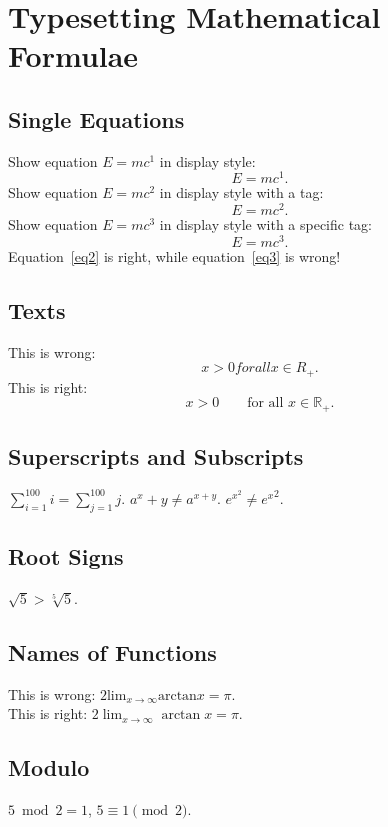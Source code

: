 \documentclass[a4paper,10pt]{article}
\begin{document}
    \section{Typesetting Mathematical Formulae}
    \subsection{Single Equations}
    Show equation $E=mc^1$ in display style:
    \begin{equation*}
        E=mc^1.
    \end{equation*}
    Show equation $E=mc^2$ in display style with a tag:
    \begin{equation}
        E=mc^2. \label{eq2}
    \end{equation}
    Show equation $E=mc^3$ in display style with a specific tag:
    \begin{equation}
        E=mc^3. \tag{$\ast$} \label{eq3}
    \end{equation}
    Equation~\eqref{eq2} is right, while equation~\eqref{eq3} is wrong!
    \subsection{Texts}
    This is wrong:
    \begin{equation*}
        x > 0    for all x \in R_+.
    \end{equation*}
    This is right:
    \begin{equation*}
        x > 0 \qquad \text{for all } x \in \mathbb{R_+}.
    \end{equation*}
    \subsection{Superscripts and Subscripts}
    $ \sum_{i=1}^{100} i = \sum^{100}_{j=1} j $.
    $ a^x+y \neq a^{x+y} $.
    $ e^{x^2} \neq {e^x}^2 $.
    \subsection{Root Signs}
    $ \sqrt{5} > \sqrt[5]{5} $.
    \subsection{Names of Functions}
    This is wrong:
    $ 2 \text{lim}_{x \rightarrow \infty} \text{arctan} x = \pi $.\\
    This is right:
    $ 2 \lim_{x \rightarrow \infty} \arctan x = \pi $.
    \subsection{Modulo}
    $ 5 \bmod 2 = 1$, $ 5 \equiv 1 \pmod{2}$.
\end{document}
